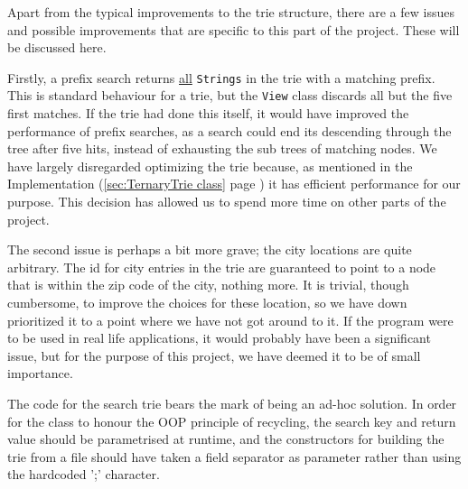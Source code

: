 Apart from the typical improvements to the trie structure, there are a few issues and possible improvements that are specific to this part of the project. These will be discussed here.

Firstly, a prefix search returns \underline{all} \texttt{Strings} in the trie with a matching prefix.
This is standard behaviour for a trie, but the \texttt{View} class discards all but the five first matches. If the trie had done this itself, it would have improved the performance of prefix searches, as a search could end its descending through the tree after five hits, instead of exhausting the sub trees of matching nodes. We have largely disregarded optimizing the trie because, as mentioned in the Implementation (\ref{sec:TernaryTrie class} page \pageref{sec:TernaryTrie class}) it has efficient performance for our purpose. This decision has allowed us to spend more time on other parts of the project.

The second issue is perhaps a bit more grave; the city locations are quite arbitrary.
The id for city entries in the trie are guaranteed to point to a node that is within the zip code of the city, nothing more. It is trivial, though cumbersome, to improve the choices for these location, so we have down prioritized it to a point where we have not got around to it.
If the program were to be used in real life applications, it would probably have been a significant issue, but for the purpose of this project, we have deemed it to be of small importance.

The code for the search trie bears the mark of being an ad-hoc solution. In order for the class to honour the OOP principle of recycling, the search key and return value should be parametrised at runtime, and the constructors for building the trie from a file should have taken a field separator as parameter rather than using the hardcoded ';' character.

